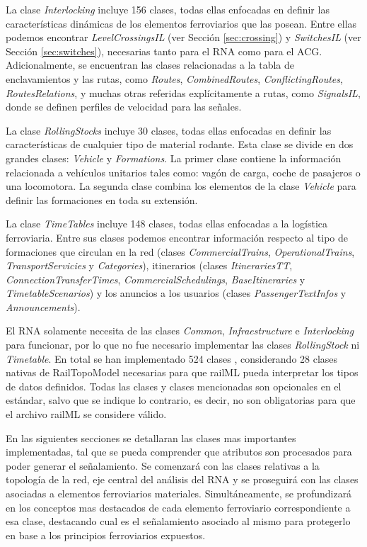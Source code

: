     La clase \textit{Interlocking} incluye 156 clases, todas ellas enfocadas en definir las características dinámicas de los elementos ferroviarios que las posean. Entre ellas podemos encontrar \textit{LevelCrossingsIL} (ver Sección \ref{sec:crossing}) y \textit{SwitchesIL} (ver Sección \ref{sec:switches}), necesarias tanto para el RNA como para el ACG. Adicionalmente, se encuentran las clases relacionadas a la tabla de enclavamientos y las rutas, como \textit{Routes}, \textit{CombinedRoutes}, \textit{ConflictingRoutes}, \textit{RoutesRelations},  y muchas otras referidas explícitamente a rutas, como \textit{SignalsIL}, donde se definen perfiles de velocidad para las señales. 
    
    La clase \textit{RollingStocks} incluye 30 clases, todas ellas enfocadas en definir las características de cualquier tipo de material rodante. Esta clase se divide en dos grandes clases: \textit{Vehicle} y \textit{Formations}. La primer clase contiene la información relacionada a vehículos unitarios tales como: vagón de carga, coche de pasajeros o una locomotora. La segunda clase combina los elementos de la clase \textit{Vehicle} para definir las formaciones en toda su extensión.
    
    La clase \textit{TimeTables} incluye 148 clases, todas ellas enfocadas a la logística ferroviaria. Entre sus clases podemos encontrar información respecto al tipo de formaciones que circulan en la red (clases \textit{CommercialTrains}, \textit{OperationalTrains}, \textit{TransportServicies} y \textit{Categories}), itinerarios (clases \textit{ItinerariesTT}, \textit{ConnectionTransferTimes}, \textit{CommercialSchedulings}, \textit{BaseItineraries} y \textit{TimetableScenarios}) y los anuncios a los usuarios (clases \textit{PassengerTextInfos} y \textit{Announcements}).   
    
    El RNA solamente necesita de las clases \textit{Common}, \textit{Infraestructure} e \textit{Interlocking} para funcionar, por lo que no fue necesario implementar las clases \textit{RollingStock} ni \textit{Timetable}. En total se han implementado 524 clases \cite{GITHUB}, considerando 28 clases nativas de RailTopoModel necesarias para que railML pueda interpretar los tipos de datos definidos. Todas las clases y clases mencionadas son opcionales en el estándar, salvo que se indique lo contrario, es decir, no son obligatorias para que el archivo railML se considere válido.

    En las siguientes secciones se detallaran las clases mas importantes implementadas, tal que se pueda comprender que atributos son procesados para poder generar el señalamiento. Se comenzará con las clases relativas a la topología de la red, eje central del análisis del RNA y se proseguirá con las clases asociadas a elementos ferroviarios materiales. Simultáneamente, se profundizará en los conceptos mas destacados de cada elemento ferroviario correspondiente a esa clase, destacando cual es el señalamiento asociado al mismo para protegerlo en base a los principios ferroviarios expuestos.

